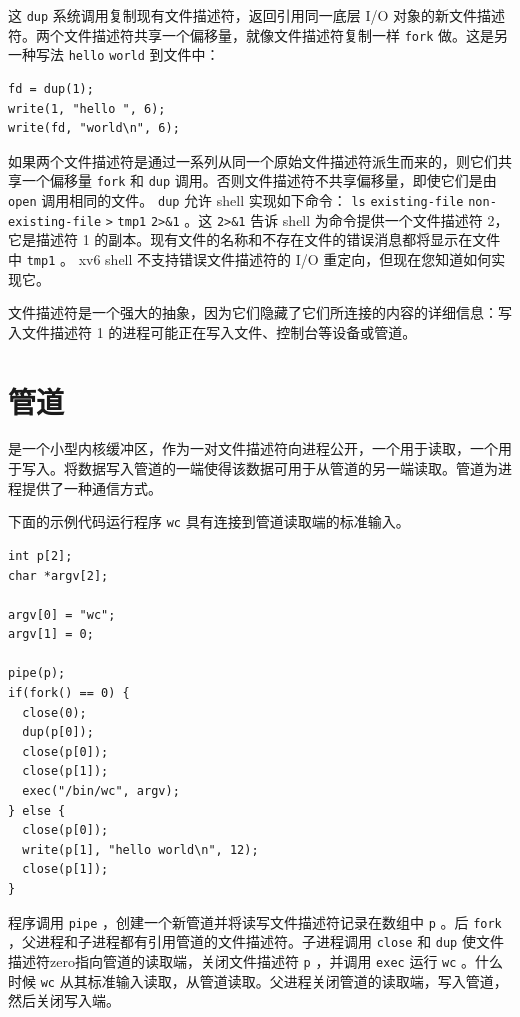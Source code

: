 这
    \lstinline{dup}    系统调用复制现有文件描述符，返回引用同一底层 I/O 对象的新文件描述符。两个文件描述符共享一个偏移量，就像文件描述符复制一样
    \lstinline{fork}    做。这是另一种写法
    \lstinline{hello}   
    \lstinline{world}    到文件中：
\begin{lstlisting}[]
fd = dup(1);
write(1, "hello ", 6);
write(fd, "world\n", 6);
\end{lstlisting}
如果两个文件描述符是通过一系列从同一个原始文件描述符派生而来的，则它们共享一个偏移量
    \lstinline{fork}    和
    \lstinline{dup}    调用。否则文件描述符不共享偏移量，即使它们是由
    \lstinline{open}    调用相同的文件。
    \lstinline{dup}    允许 shell 实现如下命令：
    \lstinline{ls}   
    \lstinline{existing-file}   
    \lstinline{non-existing-file}   
    \lstinline{>}   
    \lstinline{tmp1}   
    \lstinline{2>&1}    。这
    \lstinline{2>&1}    告诉 shell 为命令提供一个文件描述符 2，它是描述符 1 的副本。现有文件的名称和不存在文件的错误消息都将显示在文件中
    \lstinline{tmp1}    。 xv6 shell 不支持错误文件描述符的 I/O 重定向，但现在您知道如何实现它。  

文件描述符是一个强大的抽象，因为它们隐藏了它们所连接的内容的详细信息：写入文件描述符 1 的进程可能正在写入文件、控制台等设备或管道。
    \section{管道  }     


        是一个小型内核缓冲区，作为一对文件描述符向进程公开，一个用于读取，一个用于写入。将数据写入管道的一端使得该数据可用于从管道的另一端读取。管道为进程提供了一种通信方式。  

下面的示例代码运行程序
    \lstinline{wc}    具有连接到管道读取端的标准输入。
\begin{lstlisting}[]
int p[2];
char *argv[2];

argv[0] = "wc";
argv[1] = 0;

pipe(p);
if(fork() == 0) {
  close(0);
  dup(p[0]);
  close(p[0]);
  close(p[1]);
  exec("/bin/wc", argv);
} else {
  close(p[0]);
  write(p[1], "hello world\n", 12);
  close(p[1]);
}
\end{lstlisting}   程序调用
    \lstinline{pipe}    ，创建一个新管道并将读写文件描述符记录在数组中
    \lstinline{p}    。后
    \lstinline{fork}    ，父进程和子进程都有引用管道的文件描述符。子进程调用   \lstinline{close}   和   \lstinline{dup}   使文件描述符zero指向管道的读取端，关闭文件描述符
    \lstinline{p}    ，并调用   \lstinline{exec}   运行
    \lstinline{wc}    。什么时候
    \lstinline{wc}    从其标准输入读取，从管道读取。父进程关闭管道的读取端，写入管道，然后关闭写入端。  

